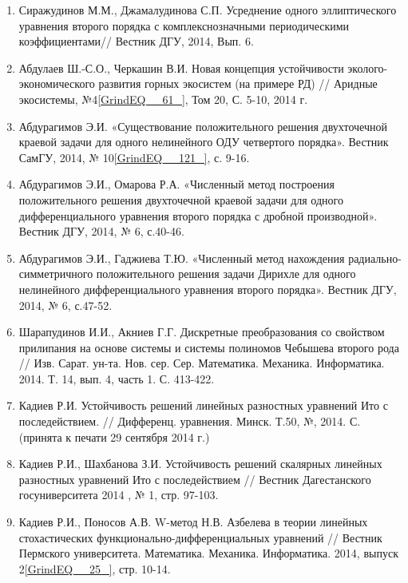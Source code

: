 \documentclass{article}
\begin{document}
\begin{enumerate}
\item  Сиражудинов М.М., Джамалудинова С.П.\textbf{ }Усреднение одного эллиптического уравнения второго порядка с комплекснозначными периодическими коэффициентами// Вестник ДГУ, 2014, Вып. 6.

\item  Абдулаев Ш.-С.О., Черкашин В.И. Новая концепция устойчивости эколого-экономического развития горных экосистем (на примере РД) // Аридные экосистемы, №4\eqref{GrindEQ__61_}, Том 20, С. 5-10, 2014 г.

\item  Абдурагимов Э.И. «Существование положительного решения двухточечной краевой задачи для одного нелинейного ОДУ четвертого порядка». Вестник СамГУ, 2014, № 10\eqref{GrindEQ__121_}, с. 9-16.

\item  Абдурагимов Э.И., Омарова Р.А. «Численный метод построения положительного решения двухточечной краевой задачи для одного дифференциального уравнения второго порядка с дробной производной». Вестник ДГУ, 2014, № 6, с.40-46.

\item  Абдурагимов Э.И., Гаджиева Т.Ю. «Численный метод нахождения радиально-симметричного положительного решения задачи Дирихле для одного нелинейного дифференциального уравнения второго порядка». Вестник ДГУ, 2014, № 6, с.47-52.

\item  Шарапудинов И.И., Акниев Г.Г. Дискретные преобразования со свойством прилипания на основе системы  и системы полиномов Чебышева второго рода // Изв. Сарат. ун-та. Нов. сер. Сер. Математика. Механика. Информатика. 2014. Т. 14, вып. 4, часть 1. С. 413-422.

\item  Кадиев Р.И. Устойчивость решений линейных разностных уравнений Ито с последействием. // Дифференц. уравнения. Минск. Т.50, №, 2014. С. (принята к печати 29 сентября 2014 г.)

\item  Кадиев Р.И., Шахбанова З.И. Устойчивость решений скалярных линейных разностных уравнений Ито с последействием // Вестник Дагестанского госуниверситета 2014 , № 1, стр. 97-103.

\item  Кадиев Р.И., Поносов А.В. W-метод Н.В. Азбелева в теории линейных стохастических функционально-дифференциальных уравнений // Вестник Пермского университета. Математика. Механика. Информатика. 2014, выпуск 2\eqref{GrindEQ__25_}, стр. 10-14.


\end{enumerate}
\end{document}
